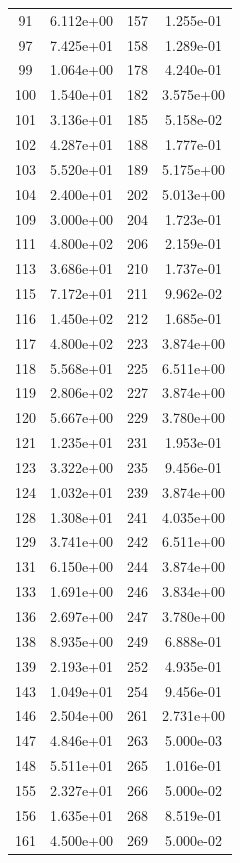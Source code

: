 \documentclass[12pt]{article}
\begin{document}
\begin{longtable}{@{}cccc@{}}
91 & 6.112e+00 & 157 & 1.255e-01 \\
97 & 7.425e+01 & 158 & 1.289e-01 \\
99 & 1.064e+00 & 178 & 4.240e-01 \\
100 & 1.540e+01 & 182 & 3.575e+00 \\
101 & 3.136e+01 & 185 & 5.158e-02 \\
102 & 4.287e+01 & 188 & 1.777e-01 \\
103 & 5.520e+01 & 189 & 5.175e+00 \\
104 & 2.400e+01 & 202 & 5.013e+00 \\
109 & 3.000e+00 & 204 & 1.723e-01 \\
111 & 4.800e+02 & 206 & 2.159e-01 \\
113 & 3.686e+01 & 210 & 1.737e-01 \\
115 & 7.172e+01 & 211 & 9.962e-02 \\
116 & 1.450e+02 & 212 & 1.685e-01 \\
117 & 4.800e+02 & 223 & 3.874e+00 \\
118 & 5.568e+01 & 225 & 6.511e+00 \\
119 & 2.806e+02 & 227 & 3.874e+00 \\
120 & 5.667e+00 & 229 & 3.780e+00 \\
121 & 1.235e+01 & 231 & 1.953e-01 \\
123 & 3.322e+00 & 235 & 9.456e-01 \\
124 & 1.032e+01 & 239 & 3.874e+00 \\
128 & 1.308e+01 & 241 & 4.035e+00 \\
129 & 3.741e+00 & 242 & 6.511e+00 \\
131 & 6.150e+00 & 244 & 3.874e+00 \\
133 & 1.691e+00 & 246 & 3.834e+00 \\
136 & 2.697e+00 & 247 & 3.780e+00 \\
138 & 8.935e+00 & 249 & 6.888e-01 \\
139 & 2.193e+01 & 252 & 4.935e-01 \\
143 & 1.049e+01 & 254 & 9.456e-01 \\
146 & 2.504e+00 & 261 & 2.731e+00 \\
147 & 4.846e+01 & 263 & 5.000e-03 \\
148 & 5.511e+01 & 265 & 1.016e-01 \\
155 & 2.327e+01 & 266 & 5.000e-02 \\
156 & 1.635e+01 & 268 & 8.519e-01 \\
161 & 4.500e+00 & 269 & 5.000e-02 \\

\end{longtable}
\end{document}
